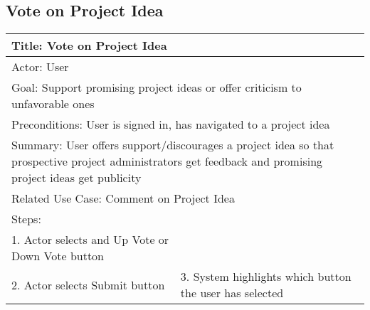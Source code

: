 \documentclass[10pt,a4paper]{article}
\begin{document}
\subsection{Vote on Project Idea	}
\begin{tabular}{|p{6cm}|p{6cm}|} \hline
\multicolumn{2}{|p{12cm}|}{Title: Vote on Project Idea	}                                                                                       \\ \hline
\multicolumn{2}{|p{12cm}|}{Actor: User	}                                                                                                       \\ \hline
\multicolumn{2}{|p{12cm}|}{Goal: Support promising project ideas or offer criticism to unfavorable ones	} \\ \hline
\multicolumn{2}{|p{12cm}|}{Preconditions: User is signed in, has navigated to a project idea	}                                                                                               \\ \hline
\multicolumn{2}{|p{12cm}|}{Summary: User offers support/discourages a project idea so that prospective project administrators get feedback and promising project ideas get publicity		}                           \\ \hline
\multicolumn{2}{|p{12cm}|}{Related Use Case: Comment on Project Idea	}                               \\ \hline
Steps:                                                                              &                                                 \\ \hline
1. Actor selects and Up Vote or Down Vote button &                                                 \\ \hline
2. Actor selects Submit button      & 3. System highlights which button the user has selected                                                 \\ \hline


\end{tabular}
\end{document}

